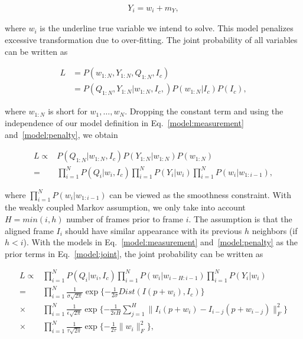 \documentclass[10pt,journal]{IEEEtran}
\begin{document}
\begin{align}
\label{model:penalty}
Y_i=w_i+m_Y,
\end{align}

\noindent where $w_i$ is the underline true variable we intend to solve. This model penalizes excessive transformation due to over-fitting. The joint probability of all variables can be written as

\begin{equation}
\begin{aligned}
L&=P(w_{1:N},Y_{1:N},Q_{1:N},I_c) \\
 &=P(Q_{1:N},Y_{1:N}|w_{1:N},I_c,)P(w_{1:N}|I_c)P(I_c),
\end{aligned}
\end{equation}

\noindent where $w_{1:N}$ is short for $w_1,\ldots,w_N$. Dropping the constant term and using the independence of our model definition in Eq.~\eqref{model:measurement} and~\eqref{model:penalty}, we obtain

\begin{equation}
\begin{aligned}
L\propto & P(Q_{1:N}|w_{1:N},I_c) P(Y_{1:N}|w_{1:N}) P(w_{1:N}) \\
				=& \prod_{i=1}^N{P(Q_i|w_i,I_c)} \prod_{i=1}^N{P(Y_i|w_i)} \prod_{i=1}^N {P(w_i|w_{1:i-1})},
\label{model:joint}
\end{aligned}
\end{equation}

\noindent where $\prod_{i=1}^N {P(w_i|w_{1:i-1})}$ can be viewed as the smoothness constraint. With the weakly coupled Markov assumption, we only take into account $H=min(i,h)$ number of frames prior to frame $i$. The assumption is that the aligned frame $I_i$ should have similar appearance with its previous $h$ neighbors (if $h<i$). With the models in Eq.~\eqref{model:measurement} and~\eqref{model:penalty} as the prior terms in Eq.~\eqref{model:joint}, the joint probability can be written as 

\begin{align}
L\propto & \prod_{i=1}^N{P(Q_i|w_i,I_c)} \prod_{i=1}^N {P(w_i|w_{i-H:i-1})} \prod_{i=1}^N{P(Y_i|w_i)} \\
\label{data_exp}
				=& \prod_{i=1}^N \frac{1}{\sigma \sqrt{2\pi}} \exp\{-\frac{1}{2\sigma}Dist(I(p+w_i),I_c)\}  \\
\label{smooth_exp}
				\times &\prod_{i=1}^N \frac{1}{\epsilon \sqrt{2\pi}} \exp\{-\frac{1}{2\epsilon H}\sum_{j=1}^{H}\parallel{I_i(p+w_i)-I_{i-j}(p+w_{i-j})}\parallel_F^2\} \\
\label{penalty_exp}
				\times &\prod_{i=1}^N \frac{1}{\tau \sqrt{2\pi}} \exp\{-\frac{1}{2\tau}\parallel{w_i}\parallel_F^2\},
\end{align}
\end{document}
